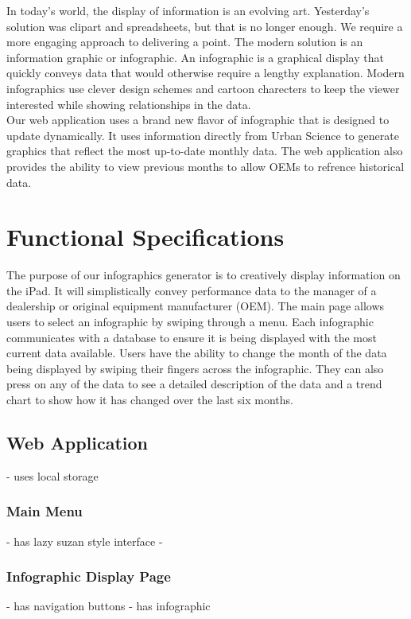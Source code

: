 \documentclass[11pt,a4paper,oneside]{article}
\begin{document}
In today's world, the display of information is an evolving art. Yesterday's solution was clipart and spreadsheets, but that is no longer enough. We require a more engaging approach to delivering a point. The modern solution is an information graphic or infographic. An infographic is a graphical display that quickly conveys data that would otherwise require a lengthy explanation. Modern infographics use clever design schemes and cartoon charecters to keep the viewer interested while showing relationships in the data.\\


Our web application uses a brand new flavor of infographic that is designed to update dynamically. It uses information directly from Urban Science to generate graphics that reflect the most up-to-date monthly data. The web application also provides the ability to view previous months to allow OEMs to refrence historical data.\\

\newpage

\section{Functional Specifications}


The purpose of our infographics generator is to creatively display information on the iPad.  It will simplistically convey performance data to the manager of a dealership or original equipment manufacturer (OEM).  The main page allows users to select an infographic by swiping through a menu.  Each infographic communicates with a database to ensure it is being displayed with the most current data available.  Users have the ability to change the month of the data being displayed by swiping their fingers across the infographic.  They can also press on any of the data to see a detailed description of the data and a trend chart to show how it has changed over the last six months.




\subsection {Web Application}
 - uses local storage


\subsubsection {Main Menu}
 - has lazy suzan style interface
 - 

\subsubsection {Infographic Display Page}
 - has navigation buttons
 - has infographic
\end{document}
